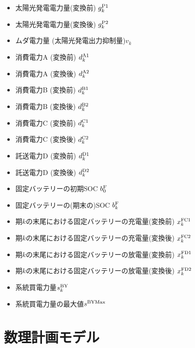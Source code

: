 \documentclass{jarticle}
\newcommand{\IB}{$\bullet$}
\newcommand{\IC}{$\circ$}
\begin{document}
 \begin{itemize}
  \item[\IB] 太陽光発電電力量(変換前) $g^{\rm P1}_{k}$
  \item[\IB] 太陽光発電電力量(変換後) $g^{\rm P2}_{k}$
  \item[\IC] ムダ電力量 (太陽光発電出力抑制量)$v_{k}$ \\[-2.5ex]
  \item[\IB] 消費電力A (変換前) $d^{\rm A1}_{k}$
  \item[\IB] 消費電力A (変換後) $d^{\rm A2}_{k}$
  \item[\IB] 消費電力B (変換前) $d^{\rm B1}_{k}$
  \item[\IB] 消費電力B (変換後) $d^{\rm B2}_{k}$
  \item[\IB] 消費電力C (変換前) $d^{\rm C1}_{k}$
  \item[\IB] 消費電力C (変換後) $d^{\rm C2}_{k}$
  \item[\IC] 託送電力D (変換前) $d^{\rm D1}_{k}$
  \item[\IC] 託送電力D (変換後) $d^{\rm D2}_{k}$
  \item[\IB] 固定バッテリーの初期SOC $b^{\rm F}_{0}$
  \item[\IC] 固定バッテリーの(期末の)SOC $b^{\rm F}_{k}$
  \item[\IC] 期$k$の末尾における固定バッテリーの充電量(変換前) $x^{\rm FC1}_{k}$
  \item[\IC] 期$k$の末尾における固定バッテリーの充電量(変換後) $x^{\rm FC2}_{k}$
  \item[\IC] 期$k$の末尾における固定バッテリーの放電量(変換前) $x^{\rm FD1}_{k}$
  \item[\IC] 期$k$の末尾における固定バッテリーの放電量(変換後) $x^{\rm FD2}_{k}$ \\[-2.5ex]

  \item[\IC] 系統買電力量$s^{\rm BY}_{k}$
  \item[\IC] 系統買電力量の最大値$s^{\rm BYMax}$
\end{itemize}


\section{数理計画モデル}
\end{document}
